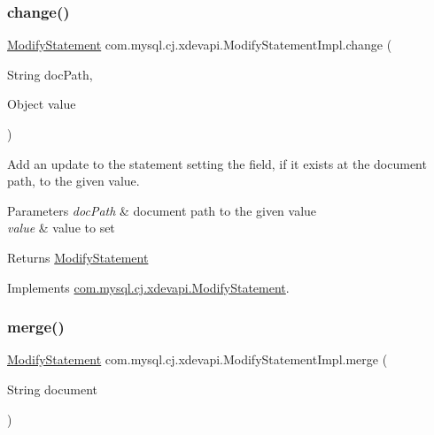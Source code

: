 \subsubsection{\texorpdfstring{change()}{change()}}
{\footnotesize\ttfamily \mbox{\hyperlink{interfacecom_1_1mysql_1_1cj_1_1xdevapi_1_1_modify_statement}{Modify\+Statement}} com.\+mysql.\+cj.\+xdevapi.\+Modify\+Statement\+Impl.\+change (\begin{DoxyParamCaption}\item[{String}]{doc\+Path,  }\item[{Object}]{value }\end{DoxyParamCaption})}

Add an update to the statement setting the field, if it exists at the document path, to the given value.


\begin{DoxyParams}{Parameters}
{\em doc\+Path} & document path to the given value \\
\hline
{\em value} & value to set \\
\hline
\end{DoxyParams}
\begin{DoxyReturn}{Returns}
\mbox{\hyperlink{interfacecom_1_1mysql_1_1cj_1_1xdevapi_1_1_modify_statement}{Modify\+Statement}} 
\end{DoxyReturn}


Implements \mbox{\hyperlink{interfacecom_1_1mysql_1_1cj_1_1xdevapi_1_1_modify_statement_acb3745c970e50cf538e8d9b2295a08e1}{com.\+mysql.\+cj.\+xdevapi.\+Modify\+Statement}}.

\mbox{\label{classcom_1_1mysql_1_1cj_1_1xdevapi_1_1_modify_statement_impl_acd828dfa9665ae9290662791d1e0da96}} 
\subsubsection{\texorpdfstring{merge()}{merge()}}
{\footnotesize\ttfamily \mbox{\hyperlink{interfacecom_1_1mysql_1_1cj_1_1xdevapi_1_1_modify_statement}{Modify\+Statement}} com.\+mysql.\+cj.\+xdevapi.\+Modify\+Statement\+Impl.\+merge (\begin{DoxyParamCaption}\item[{String}]{document }\end{DoxyParamCaption})}

